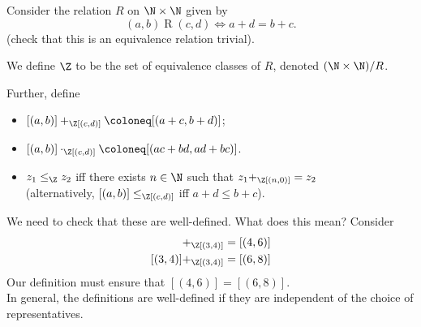 Consider the relation $R$ on $\N \times \N$ given by \[
    (a, b) \mathrel{R} (c, d) \iff a + d = b + c.
\] (\textcolor{exercise}{check that this is an equivalence relation}
\textcolor{solved}{trivial}).
\begin{definition*} \label{def:integers}
    We define $\Z$ to be the set of equivalence classes of $R$, denoted
    $(\N \times \N) / R$.
\end{definition*}
Further, define
\begin{definition} \label{def:integers:operations} \leavevmode
    \begin{itemize}
        \item $[(a, b)] +_\Z [(c, d)] \coloneq [(a + c, b + d)]$;
        \item $[(a, b)] \cdot_\Z [(c, d)] \coloneq [(ac + bd, ad + bc)]$.
        \item $z_1 \le_\Z z_2$ iff there exists $n \in \N$ such that
        $z_1 +_\Z [(n, 0)] = z_2$ \\
        (alternatively, $[(a, b)] \le_\Z [(c, d)]$ iff $a + d \le b + c$).
    \end{itemize}
\end{definition}
We need to check that these are well-defined.
What does this mean?
Consider \begin{align*}
    [(1, 2)] +_\Z [(3, 4)] &= [(4, 6)] \\
    [(3, 4)] +_\Z [(3, 4)] &= [(6, 8)]
\end{align*}
Our definition must ensure that $[(4, 6)] = [(6, 8)]$. \\
In general, the definitions are well-defined if they are independent of the
choice of representatives.
